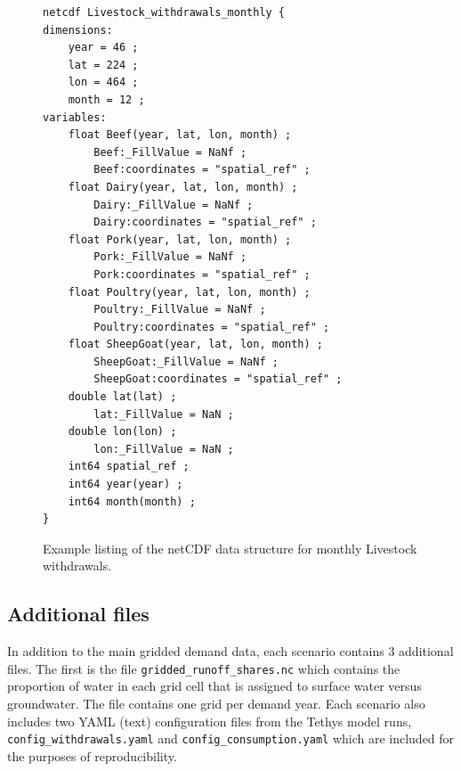 \documentclass[fleqn,10pt]{wlscirep}
\begin{document}
\begin{figure}
    \centering
    \begin{verbatim}
netcdf Livestock_withdrawals_monthly {
dimensions:
    year = 46 ;
    lat = 224 ;
    lon = 464 ;
    month = 12 ;
variables:
    float Beef(year, lat, lon, month) ;
        Beef:_FillValue = NaNf ;
        Beef:coordinates = "spatial_ref" ;
    float Dairy(year, lat, lon, month) ;
        Dairy:_FillValue = NaNf ;
        Dairy:coordinates = "spatial_ref" ;
    float Pork(year, lat, lon, month) ;
        Pork:_FillValue = NaNf ;
        Pork:coordinates = "spatial_ref" ;
    float Poultry(year, lat, lon, month) ;
        Poultry:_FillValue = NaNf ;
        Poultry:coordinates = "spatial_ref" ;
    float SheepGoat(year, lat, lon, month) ;
        SheepGoat:_FillValue = NaNf ;
        SheepGoat:coordinates = "spatial_ref" ;
    double lat(lat) ;
        lat:_FillValue = NaN ;
    double lon(lon) ;
        lon:_FillValue = NaN ;
    int64 spatial_ref ;
    int64 year(year) ;
    int64 month(month) ;
}
\end{verbatim}
    \caption{Example listing of the netCDF data structure for monthly Livestock withdrawals.}
    \label{fig:data-listing}
\end{figure}


\subsection{Additional files}

In addition to the main gridded demand data, each scenario contains 3 additional files. The first is the file \verb|gridded_runoff_shares.nc| which contains the proportion of water in each grid cell that is assigned to surface water versus groundwater. The file contains one grid per demand year. Each scenario also includes two YAML (text) configuration files from the Tethys model runs, \verb|config_withdrawals.yaml| and \verb|config_consumption.yaml| which are included for the purposes of reproducibility. 
\end{document}
